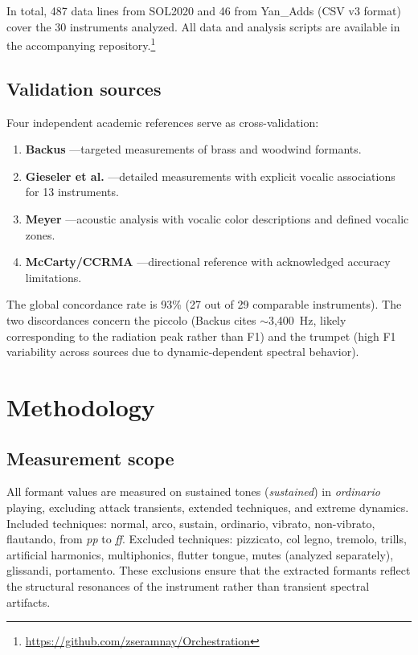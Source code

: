 \documentclass[12pt,a4paper]{article}
\begin{document}
In total, 487 data lines from SOL2020 and 46 from Yan\_Adds (CSV v3 format)
cover the 30 instruments analyzed. All data and analysis scripts are available
in the accompanying repository.\footnote{\url{https://github.com/zseramnay/Orchestration}}

\subsection{Validation sources}

Four independent academic references serve as cross-validation:

\begin{enumerate}
\item \textbf{Backus} \citep{Backus1969}---targeted measurements of brass and
woodwind formants.
\item \textbf{Gieseler et al.} \citep{Gieseler1985}---detailed measurements with
explicit vocalic associations for 13 instruments.
\item \textbf{Meyer} \citep{Meyer2009}---acoustic analysis with vocalic color
descriptions and defined vocalic zones.
\item \textbf{McCarty/CCRMA} \citep{McCarty2003}---directional reference with
acknowledged accuracy limitations.
\end{enumerate}

The global concordance rate is 93\% (27 out of 29 comparable instruments). The two
discordances concern the piccolo (Backus cites $\sim$3,400~Hz, likely corresponding
to the radiation peak rather than F1) and the trumpet (high F1 variability across
sources due to dynamic-dependent spectral behavior).

\section{Methodology}
\label{sec:methodology}

\subsection{Measurement scope}

All formant values are measured on sustained tones (\emph{sustained}) in
\emph{ordinario} playing, excluding attack transients, extended techniques, and
extreme dynamics. Included techniques: normal, arco, sustain, ordinario,
vibrato, non-vibrato, flautando, from \emph{pp} to \emph{ff}. Excluded
techniques: pizzicato, col legno, tremolo, trills, artificial harmonics,
multiphonics, flutter tongue, mutes (analyzed separately), glissandi,
portamento. These exclusions ensure that the extracted formants reflect the
structural resonances of the instrument rather than transient spectral artifacts.
\end{document}
